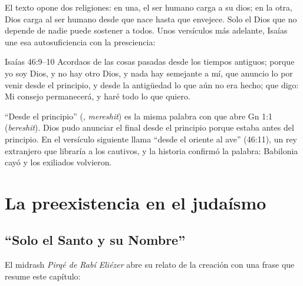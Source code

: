 El texto opone dos religiones: en una, el ser humano carga a su dios; en la otra, Dios carga al ser humano desde que nace hasta que envejece. Solo el Dios que no depende de nadie puede sostener a todos. Unos versículos más adelante, Isaías une esa autosuficiencia con la presciencia:

\begin{verso}{Isaías 46:9–10}
Acordaos de las cosas pasadas desde los tiempos antiguos; porque yo soy Dios, y no hay otro Dios, y nada hay semejante a mí, que anuncio lo por venir desde el principio, y desde la antigüedad lo que aún no era hecho; que digo: Mi consejo permanecerá, y haré todo lo que quiero.
\end{verso}

``Desde el principio'' (, \emph{mereshit}) es la misma palabra con que abre Gn 1:1 (\emph{bereshit}). Dios pudo anunciar el final desde el principio porque estaba antes del principio. En el versículo siguiente llama ``desde el oriente al ave'' (46:11), un rey extranjero que libraría a los cautivos, y la historia confirmó la palabra: Babilonia cayó y los exiliados volvieron.


\section{La preexistencia en el judaísmo}\label{sec:pre-judaismo}

\subsection{“Solo el Santo y su Nombre”}
El midrash \emph{Pirqé de Rabí Eliézer} abre su relato de la creación con una frase que resume este capítulo:


